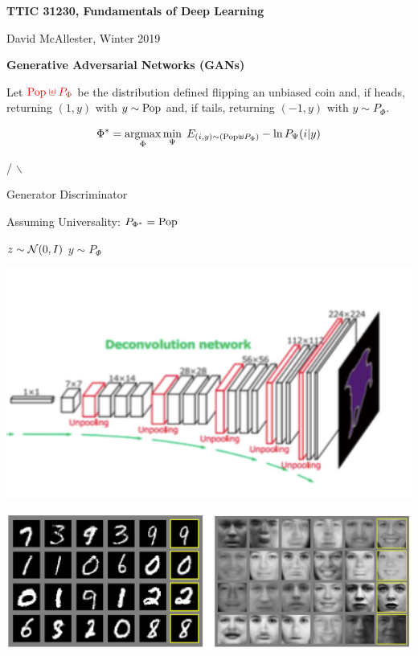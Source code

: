 





{\Huge

  \centerline{\bf TTIC 31230, Fundamentals of Deep Learning}
  \bigskip
  \centerline{David McAllester, Winter 2019}
  \vfill
  \centerline{\bf Generative Adversarial Networks (GANs)}
  \vfill
\vfill
\vfill


Let ${\color{red} \mathrm{Pop} \uplus P_\Phi}$ be the distribution defined flipping an unbiased coin and, if heads, returning {\color{red} $(1,y)$} with
{\color{red} $y \sim \mathrm{Pop}$} and, if tails, returning {\color{red} $(-1,y)$} with {\color{red} $y \sim P_\Phi$}.

{\color{red} $$\Phi^* = \operatorname*{argmax}_\Phi \min_\Psi \;E_{(i,y) \sim (\mathrm{Pop} \uplus P_\Phi)} - \ln P_\Psi(i|y)$$}
\centerline{/\hspace{2.5em} $\backslash$ \hspace{9.5em}~}
\centerline{Generator \hspace{2em}Discriminator \hspace{8em}~}

\vfill
Assuming Universality: {\color{red} $P_{\Phi^*} = \mathrm{Pop}$}

\centerline{$z\sim {\cal N}(0,I)$ \hspace{7em} $y\sim P_\Phi$}
\centerline{\includegraphics[width=6in]{../images/halfdeconv}}

\centerline{\includegraphics[width = 9in]{../images/GAN2014}}

}
